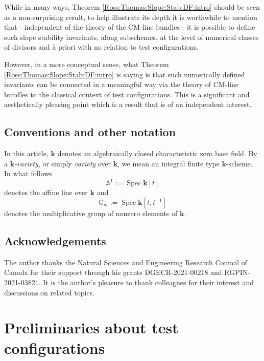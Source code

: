 \documentclass[12pt]{amsart}
\newcommand{\kk}{\mathbf{k}}
\newcommand{\spec}{\operatorname{Spec}}
\renewcommand{\AA}{\mathbb{A}} %
\newcommand{\GG}{\mathbb{G}}
\theoremstyle{definition}
\numberwithin{equation}{section}
\begin{document}
While in many ways, Theorem \ref{Ross:Thomas:Slope:Stab:DF:intro} should be seen as a non-surprising result, to help illustrate its depth it is worthwhile to mention that---independent of the theory of the CM-line bundles---it is possible to define such slope stability invariants, along subschemes, at the level of numerical classes of divisors and \`a priori with no relation to test configurations.  

However, in a more conceptual sense, what Theorem \ref{Ross:Thomas:Slope:Stab:DF:intro} is saying is that such numerically defined invariants can be connected in a meaningful way via the theory of CM-line bundles to the classical context of test configurations.  This is a significant and aesthetically pleasing point which is a result that is of an independent interest.  

\subsection*{Conventions and other notation}  In this article, $\mathbf{k}$ denotes an algebraically closed characteristic zero base field.  By a \emph{$\kk$-variety}, or  simply \emph{variety} over $\kk$, we mean an integral finite type $\kk$-scheme.  In what follows 
$$\AA^1 := \spec \kk[t]$$ 
denotes the affine line over $\kk$ and 
$$\GG_m := \spec \kk[t,t^{-1}]$$ 
denotes the multiplicative group of nonzero elements of $\kk$.

\subsection*{Acknowledgements}
The author thanks the Natural Sciences and Engineering Research Council of Canada for their support through his grants DGECR-2021-00218 and RGPIN-2021-03821. 
It is the author's pleasure to thank colleagues for their interest and discussions on related topics.

\section{Preliminaries about test configurations}
\end{document}
